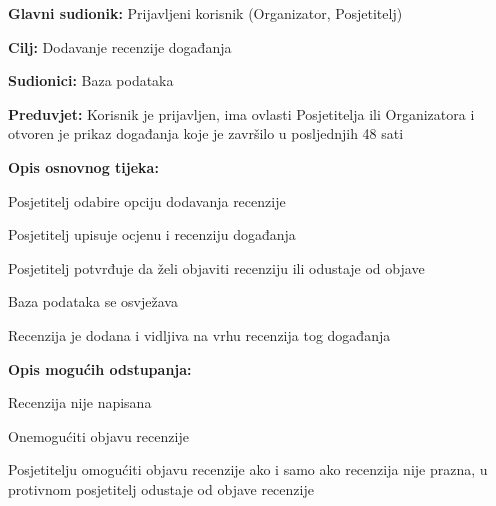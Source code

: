 
					\noindent {}
					\begin{packed_item}
						
						\item \textbf{Glavni sudionik:} Prijavljeni korisnik (Organizator, Posjetitelj)
						\item  \textbf{Cilj:} Dodavanje recenzije događanja
						\item  \textbf{Sudionici:} Baza podataka
						\item  \textbf{Preduvjet:} Korisnik je prijavljen, ima ovlasti Posjetitelja ili Organizatora i otvoren je prikaz događanja koje je završilo u posljednjih 48 sati
						\item  \textbf{Opis osnovnog tijeka:}
						
						\item[] \begin{packed_enum}
							
							\item Posjetitelj odabire opciju dodavanja recenzije
							\item Posjetitelj upisuje ocjenu i recenziju događanja
							\item Posjetitelj potvrđuje da želi objaviti recenziju ili odustaje od objave
							\item Baza podataka se osvježava
							\item Recenzija je dodana i vidljiva na vrhu recenzija tog događanja

						\end{packed_enum}
						
						\item  \textbf{Opis mogućih odstupanja:}
						
						\item[] \begin{packed_item}
							
							\item[2.a] Recenzija nije napisana 
							\item[] \begin{packed_enum}
								
								\item Onemogućiti objavu recenzije 
								\item Posjetitelju omogućiti objavu recenzije ako i samo ako recenzija nije prazna, u protivnom posjetitelj odustaje od objave recenzije
								
							\end{packed_enum}		
						\end{packed_item}
						
					\end{packed_item}
					
